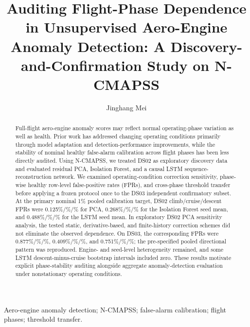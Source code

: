 \documentclass[preprint,12pt]{elsarticle}
\begin{document}
\begin{frontmatter}
\title{Auditing Flight-Phase Dependence in Unsupervised Aero-Engine Anomaly Detection: A Discovery-and-Confirmation Study on N-CMAPSS}
\author[usyd]{Jinghang Mei}
\address[usyd]{School of Electrical and Computer Engineering, The University of Sydney, Sydney, Australia}
\begin{abstract}
Full-flight aero-engine anomaly scores may reflect normal operating-phase variation as well as health. Prior work has addressed changing operating conditions primarily through model adaptation and detection-performance improvements, while the stability of nominal healthy false-alarm calibration across flight phases has been less directly audited. Using N-CMAPSS, we treated DS02 as exploratory discovery data and evaluated residual PCA, Isolation Forest, and a causal LSTM sequence-reconstruction network. We examined operating-condition correction sensitivity, phase-wise healthy row-level false-positive rates (FPRs), and cross-phase threshold transfer before applying a frozen protocol once to the DS03 independent confirmatory subset. At the primary nominal 1\% pooled calibration target, DS02 climb/\allowbreak cruise/\allowbreak descent FPRs were 0.125\%/\%/\% for PCA, 0.268\%/\%/\% for the Isolation Forest seed mean, and 0.488\%/\%/\% for the LSTM seed mean. In exploratory DS02 PCA sensitivity analysis, the tested static, derivative-based, and finite-history correction schemes did not eliminate the observed dependence. On DS03, the corresponding FPRs were 0.877\%/\%/\%, 0.409\%/\%/\%, and 0.751\%/\%/\%; the pre-specified pooled directional pattern was reproduced. Engine- and seed-level heterogeneity remained, and some LSTM descent-minus-cruise bootstrap intervals included zero. These results motivate explicit phase-stability auditing alongside aggregate anomaly-detection evaluation under nonstationary operating conditions.
\end{abstract}
\begin{keyword}
Aero-engine anomaly detection; N-CMAPSS; false-alarm calibration; flight phases; threshold transfer.
\end{keyword}
\end{frontmatter}
\thispagestyle{plain}
\end{document}
